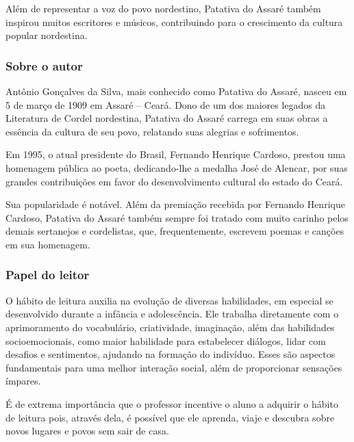 \documentclass[12pt]{extarticle}
\begin{document}
Além de representar a voz do povo nordestino, Patativa do Assaré também
inspirou muitos escritores e músicos, contribuindo para o crescimento da
cultura popular nordestina.

\subsubsection{{Sobre o autor}}

Antônio Gonçalves da Silva, mais conhecido como Patativa do Assaré,
nasceu em 5 de março de 1909 em Assaré -- Ceará. Dono de um dos maiores
legados da Literatura de Cordel nordestina, Patativa do Assaré carrega
em suas obras a essência da cultura de seu povo, relatando suas alegrias
e sofrimentos.


Em 1995, o atual presidente do Brasil, Fernando Henrique Cardoso,
prestou uma homenagem pública ao poeta, dedicando-lhe a medalha José de
Alencar, por suas grandes contribuições em favor do desenvolvimento
cultural do estado do Ceará.

Sua popularidade é notável. Além da premiação recebida por Fernando
Henrique Cardoso, Patativa do Assaré também sempre foi tratado com muito
carinho pelos demais sertanejos e cordelistas, que, frequentemente,
escrevem poemas e canções em sua homenagem.


\subsubsection{{Papel do leitor}}

O hábito de leitura auxilia na evolução de diversas habilidades, em
especial se desenvolvido durante a infância e adolescência. Ele trabalha
diretamente com o aprimoramento do vocabulário, criatividade,
imaginação, além das habilidades socioemocionais, como maior habilidade
para estabelecer diálogos, lidar com desafios e sentimentos, ajudando na
formação do indivíduo. Esses são aspectos fundamentais para uma melhor
interação social, além de proporcionar sensações ímpares.

É de extrema importância que o professor incentive o aluno a adquirir o
hábito de leitura pois, através dela, é possível que ele aprenda, viaje
e descubra sobre novos lugares e povos sem sair de casa.
\end{document}
